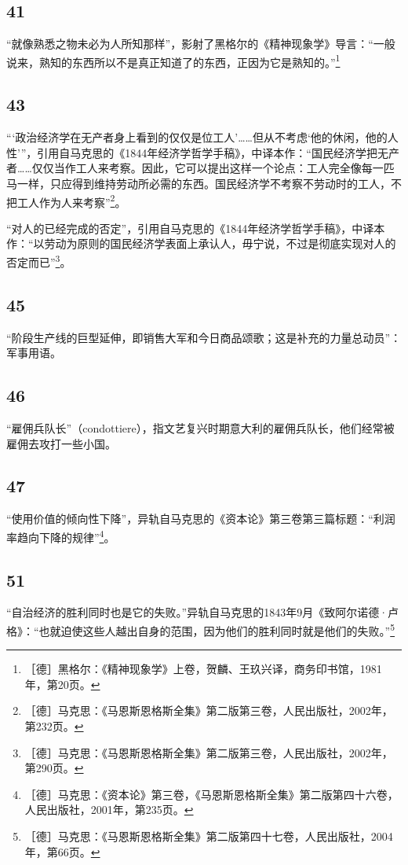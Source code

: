 \documentclass[fontset=fandol, a4paper, 12pt, openright]{ctexbook}
\begin{document}
\subsection*{41}
“就像熟悉之物未必为人所知那样”，影射了黑格尔的《精神现象学》导言：“一般说来，熟知的东西所以不是真正知道了的东西，正因为它是熟知的。”\footnote{［德］黑格尔：《精神现象学》上卷，贺麟、王玖兴译，商务印书馆，1981年，第20页。}

\subsection*{43}
“‘政治经济学在无产者身上看到的仅仅是位工人’……但从不考虑‘他的休闲，他的人性’”，引用自马克思的《1844年经济学哲学手稿》，中译本作：“国民经济学把无产者……仅仅当作工人来考察。因此，它可以提出这样一个论点：工人完全像每一匹马一样，只应得到维持劳动所必需的东西。国民经济学不考察不劳动时的工人，不把工人作为人来考察”\footnote{［德］马克思：《马恩斯恩格斯全集》第二版第三卷，人民出版社，2002年，第232页。}。

“对人的已经完成的否定”，引用自马克思的《1844年经济学哲学手稿》，中译本作：“以劳动为原则的国民经济学表面上承认人，毋宁说，不过是彻底实现对人的否定而已”\footnote{［德］马克思：《马恩斯恩格斯全集》第二版第三卷，人民出版社，2002年，第290页。}。

\subsection*{45}
“阶段生产线的巨型延伸，即销售大军和今日商品颂歌；这是补充的力量总动员”：军事用语。

\subsection*{46}
“雇佣兵队长”（condottiere），指文艺复兴时期意大利的雇佣兵队长，他们经常被雇佣去攻打一些小国。

\subsection*{47}
“使用价值的倾向性下降”，异轨自马克思的《资本论》第三卷第三篇标题：“利润率趋向下降的规律”\footnote{［德］马克思：《资本论》第三卷，《马恩斯恩格斯全集》第二版第四十六卷，人民出版社，2001年，第235页。}。

\subsection*{51}
“自治经济的胜利同时也是它的失败。”异轨自马克思的1843年9月《致阿尔诺德·卢格》：“也就迫使这些人越出自身的范围，因为他们的胜利同时就是他们的失败。”\footnote{［德］马克思：《马恩斯恩格斯全集》第二版第四十七卷，人民出版社，2004年，第66页。}
\end{document}
